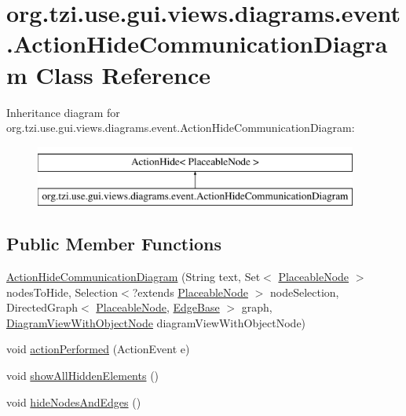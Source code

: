 \hypertarget{classorg_1_1tzi_1_1use_1_1gui_1_1views_1_1diagrams_1_1event_1_1_action_hide_communication_diagram}{\section{org.\-tzi.\-use.\-gui.\-views.\-diagrams.\-event.\-Action\-Hide\-Communication\-Diagram Class Reference}
\label{classorg_1_1tzi_1_1use_1_1gui_1_1views_1_1diagrams_1_1event_1_1_action_hide_communication_diagram}
}
Inheritance diagram for org.\-tzi.\-use.\-gui.\-views.\-diagrams.\-event.\-Action\-Hide\-Communication\-Diagram\-:\begin{figure}[H]
\begin{center}
\leavevmode
\includegraphics[height=2.000000cm]{classorg_1_1tzi_1_1use_1_1gui_1_1views_1_1diagrams_1_1event_1_1_action_hide_communication_diagram}
\end{center}
\end{figure}
\subsection*{Public Member Functions}
\begin{DoxyCompactItemize}
\item 
\hyperlink{classorg_1_1tzi_1_1use_1_1gui_1_1views_1_1diagrams_1_1event_1_1_action_hide_communication_diagram_adf3210b3e12f91ba6a59fbf4f6d50bdf}{Action\-Hide\-Communication\-Diagram} (String text, Set$<$ \hyperlink{classorg_1_1tzi_1_1use_1_1gui_1_1views_1_1diagrams_1_1elements_1_1_placeable_node}{Placeable\-Node} $>$ nodes\-To\-Hide, Selection$<$?extends \hyperlink{classorg_1_1tzi_1_1use_1_1gui_1_1views_1_1diagrams_1_1elements_1_1_placeable_node}{Placeable\-Node} $>$ node\-Selection, Directed\-Graph$<$ \hyperlink{classorg_1_1tzi_1_1use_1_1gui_1_1views_1_1diagrams_1_1elements_1_1_placeable_node}{Placeable\-Node}, \hyperlink{classorg_1_1tzi_1_1use_1_1gui_1_1views_1_1diagrams_1_1elements_1_1edges_1_1_edge_base}{Edge\-Base} $>$ graph, \hyperlink{classorg_1_1tzi_1_1use_1_1gui_1_1views_1_1diagrams_1_1_diagram_view_with_object_node}{Diagram\-View\-With\-Object\-Node} diagram\-View\-With\-Object\-Node)
\item 
void \hyperlink{classorg_1_1tzi_1_1use_1_1gui_1_1views_1_1diagrams_1_1event_1_1_action_hide_communication_diagram_a5e0bdeb923baa530e2caae17d64939a6}{action\-Performed} (Action\-Event e)
\item 
void \hyperlink{classorg_1_1tzi_1_1use_1_1gui_1_1views_1_1diagrams_1_1event_1_1_action_hide_communication_diagram_a1fd2de546155ef87aa121c53c598b465}{show\-All\-Hidden\-Elements} ()
\item 
void \hyperlink{classorg_1_1tzi_1_1use_1_1gui_1_1views_1_1diagrams_1_1event_1_1_action_hide_communication_diagram_a4b7f53be97575c28e42e868ce6f0f5ca}{hide\-Nodes\-And\-Edges} ()
\end{DoxyCompactItemize}
